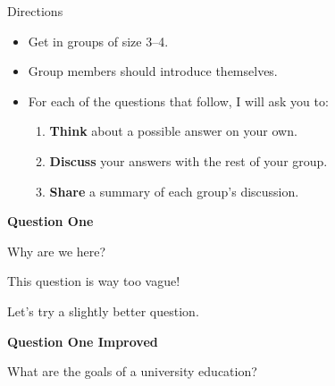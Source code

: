 \documentclass[12pt]{beamer}
\begin{document}

\author[D.C.~Ernst]{Dana C.~Ernst, Northern Arizona University}


\begin{frame}

\begin{block}{Directions}
\begin{itemize}
\item Get in groups of size 3--4.
\item Group members should introduce themselves.
\item For each of the questions that follow, I will ask you to:
\begin{enumerate}
\item \textbf{Think} about a possible answer on your own.
\item \textbf{Discuss} your answers with the rest of your group.
\item \textbf{Share} a summary of each group's discussion.
\end{enumerate}
\end{itemize}
\end{block}

\end{frame}


\begin{frame}{\textbf{Question One}}


\parbox{\linewidth}{\begin{center}
\Huge Why are we here?
\end{center}}

\pause

\begin{center}

This question is way too vague!

Let's try a slightly better question.

\end{center}

\end{frame}


\begin{frame}{\textbf{Question One Improved}}

\parbox{\linewidth}{\begin{center}
\Huge What are the goals of a university education?
\end{center}}

\end{frame}
\end{document}
